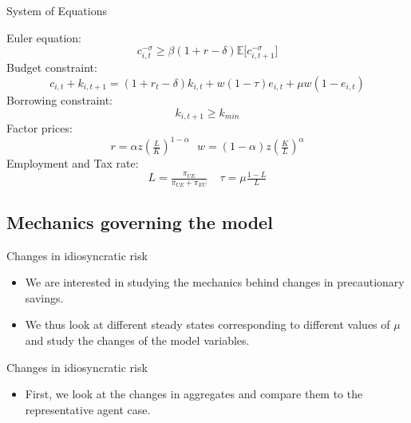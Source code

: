 \documentclass{beamer}
\begin{document}
\begin{frame}{System of Equations}
	
Euler equation:
\[ 
c_{i,t}^{- \sigma} \geq \beta (1+r -\delta){\mathbb{E}[c_{i,t+1}^{- \sigma}}]
\]
Budget constraint:
 \[ 
 c_{i,t} + k_{i,t+1} = (1 + r_{t} - \delta) k_{i,t} + w (1 - \tau)  e_{i,t} + \mu w (1 - e_{i,t})
 \]
Borrowing constraint:
  \[
  k_{i,t + 1} \geq k_{min}
	\]
Factor prices:
\[
r = \alpha z (\tfrac{L}{K})^{1-\alpha} \ \ \ w = (1-\alpha)z (\tfrac{K}{L})^{\alpha}
\]
Employment and Tax rate: 
\[
L = \tfrac{\pi_{UE}}{\pi_{UE}+\pi_{EU}} \ \ \ \ \  \tau = \mu \tfrac{1-L}{L}
\]

\end{frame}

\subsection{Mechanics governing the model}

\begin{frame}{Changes in idiosyncratic risk}
	\begin{itemize}
	
	\item {
	We are interested in studying the mechanics behind changes in precautionary savings. 
	}
	\item {
	We thus look at different steady states corresponding to different values of $\mu$ and study the changes of the model variables.
	}
	
	\end{itemize}
\end{frame}

\begin{frame}{Changes in idiosyncratic risk}
	\begin{itemize}
	
	\item {
	First, we look at the changes in aggregates and compare them to the representative agent case.
	}

	\end{itemize}
\end{frame}
\end{document}
